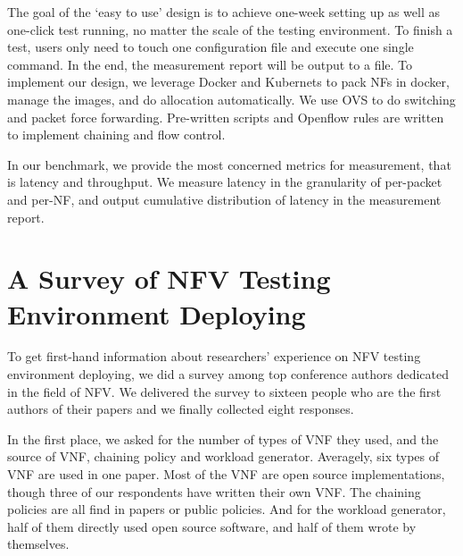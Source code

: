 \documentclass{sig-alternate-10pt}
\begin{document}
The goal of the `easy to use' design is to
achieve one-week setting up as well as one-click test running,
no matter the scale of the testing environment.
To finish a test, users only need to touch one configuration file
and execute one single command.
In the end, the measurement report will be output to a file.
To implement our design,
we leverage Docker and Kubernets to pack NFs in docker,
manage the images, and do allocation automatically.
We use OVS to do switching and packet force forwarding.
Pre-written scripts and Openflow rules are written
to implement chaining and flow control.

In our benchmark, we provide the most concerned metrics for measurement,
that is latency and throughput.
We measure latency in the granularity of per-packet and per-NF,
and output cumulative distribution of latency in the measurement report.


%
%

\section{A Survey of NFV Testing Environment Deploying}
To get first-hand information about researchers' experience on
NFV testing environment deploying,
we did a survey among top conference authors
dedicated in the field of NFV.
We delivered the survey to sixteen people
who are the first authors of their papers %
and we finally collected eight responses.

In the first place, we asked for the number of types of VNF they used,
and the source of VNF, chaining policy and workload generator.
Averagely, six types of VNF are used in one paper.
Most of the VNF are open source implementations,
though three of our respondents have written their own VNF.
The chaining policies are all find in papers or public policies.
And for the workload generator,
half of them directly used open source software,
and half of them wrote by themselves.
\end{document}
